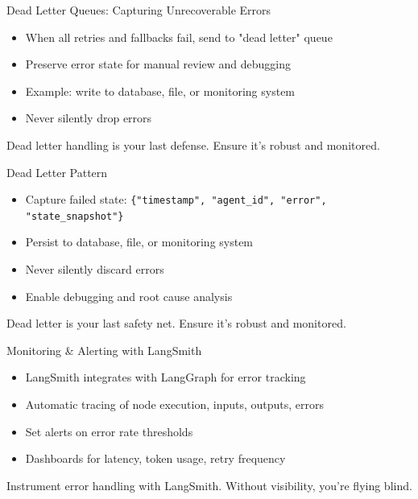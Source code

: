 \documentclass[aspectratio=169,11pt]{beamer}
\begin{document}
\begin{frame}{Dead Letter Queues: Capturing Unrecoverable Errors}
\setlength{\itemsep}{1pt}
\begin{itemize}
\item When all retries and fallbacks fail, send to "dead letter" queue
\item Preserve error state for manual review and debugging
\item Example: write to database, file, or monitoring system
\item Never silently drop errors
\end{itemize}
\vspace{0.15cm}
\begin{warningbox}[Critical]
Dead letter handling is your last defense. Ensure it's robust and monitored.
\end{warningbox}
\end{frame}

\begin{frame}{Dead Letter Pattern}
\setlength{\itemsep}{1pt}
\begin{itemize}
\item Capture failed state: \texttt{\{"timestamp", "agent\_id", "error", "state\_snapshot"\}}
\item Persist to database, file, or monitoring system
\item Never silently discard errors
\item Enable debugging and root cause analysis
\end{itemize}
\vspace{0.1cm}
\begin{warningbox}[Critical]
Dead letter is your last safety net. Ensure it's robust and monitored.
\end{warningbox}
\end{frame}

\begin{frame}{Monitoring \& Alerting with LangSmith}
\setlength{\itemsep}{1pt}
\begin{itemize}
\item LangSmith integrates with LangGraph for error tracking
\item Automatic tracing of node execution, inputs, outputs, errors
\item Set alerts on error rate thresholds
\item Dashboards for latency, token usage, retry frequency
\end{itemize}
\vspace{0.15cm}
\begin{tipbox}[Observability]
Instrument error handling with LangSmith. Without visibility, you're flying blind.
\end{tipbox}
\end{frame}
\end{document}
